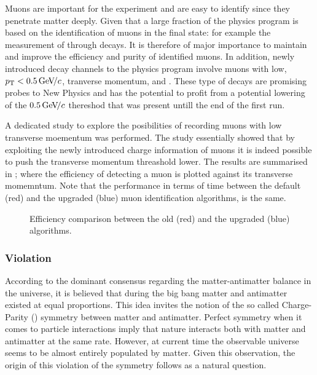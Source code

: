 Muons are important for the \lhcb experiment and are easy to identify since they penetrate matter deeply.
Given that a large fraction of the \lhcb physics program is based on the identification of muons in the
final state: for example the measurement of \phis through \BsJpsiPhi decays. It is therefore of major
importance to maintain and improve the efficiency and purity of identified muons. In addition, newly
introduced decay channels to the \lhcb physics program involve muons with low, $\mbox{$p_{\rm T}$} < 0.5 {\mathrm{\,Ge\kern -0.1em V\!/}c}$,
tranverse momentum, \eg \Sigmapmumu \cite{LHCB-CONF-2016-013-001} and \Ksmumu \cite{LHCb-CONF-2016-012}.
These type of decays are promising probes to New Physics and \lhcb has the potential to profit from a
potential lowering of the $0.5 {\mathrm{\,Ge\kern -0.1em V\!/}c}$ thereshod that was present untill the end of the first \lhc run.


A dedicated study to explore the posibilities of recording muons with low transverse
moementum was performed. The study essentially showed that by exploiting the newly introduced charge
information of muons it is indeed possible to push the transverse momentum threashold lower. The results
are summarised in \figref{}; where the efficiency of detecting a muon is plotted against its transverse
momemntum. Note that the performance in terms of time between the default (red) and the upgraded (blue)
muon identification algorithms, is the same.

\begin{figure}[t]
  \begin{subfigure}{0.5\textwidth}
    \raggedright
    \scalebox{.6}{}
    \label{app_eff_pt_zoom_comp}
  \end{subfigure}%
  \hfill
  \begin{subfigure}{0.5\textwidth}
    \raggedleft
    \scalebox{.6}{}
    \label{app_eff_p_comp}
  \end{subfigure}
    \caption{Efficiency comparison between the old (red) and the upgraded (blue) algorithms.}
  \label{app_eff_comp}
\end{figure}


\subsubsection{\CP Violation}
According to the dominant consensus regarding the matter-antimatter balance in the
universe, it is believed that during the big bang matter and antimatter existed at
equal proportions. This idea invites the notion of the so called Charge-Parity (\CP)
symmetry between matter and antimatter. Perfect \CP symmetry when it comes to particle
interactions imply that nature interacts both with matter and antimatter at the same rate.
However, at current time the observable universe seems to be almost entirely populated by
matter. Given this observation, the origin of this violation of the \CP symmetry follows
as a natural question.

